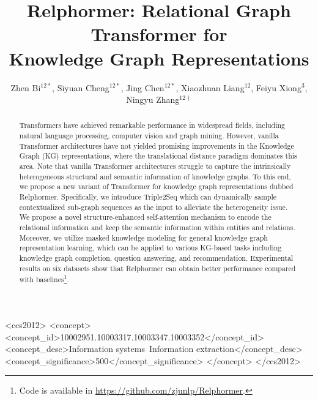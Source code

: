 \documentclass[sigconf]{acmart}
\begin{document}
\acmBooktitle{}


\title{Relphormer: Relational Graph Transformer for\\ Knowledge Graph Representations}

\author{
Zhen Bi$^{12*}$, 
Siyuan Cheng$^{12*}$, 
Jing Chen$^{12*}$, 
Xiaozhuan Liang$^{12}$, 
Feiyu Xiong$^{3}$, 
Ningyu Zhang$^{12\dagger}$
}





\begin{abstract}
Transformers have achieved remarkable performance in widespread fields, including natural language processing, computer vision and graph mining. However, vanilla Transformer architectures have not yielded promising improvements in the Knowledge Graph (KG) representations, where the translational distance paradigm dominates this area. Note that vanilla Transformer architectures struggle to capture the intrinsically heterogeneous structural and semantic information of knowledge graphs. To this end, we propose a new variant of Transformer for knowledge graph representations dubbed Relphormer. Specifically, we introduce Triple2Seq which can dynamically sample contextualized sub-graph sequences as the input to alleviate the heterogeneity issue. We propose a novel structure-enhanced self-attention mechanism to encode the relational information and keep the semantic information within entities and relations. Moreover, we utilize masked knowledge modeling for general knowledge graph representation learning, which can be applied to various KG-based tasks including knowledge graph completion, question answering, and recommendation. Experimental results on six datasets show that Relphormer can obtain better performance compared with baselines\footnote{Code is available in \url{https://github.com/zjunlp/Relphormer}.}.


\end{abstract}

\begin{CCSXML}
<ccs2012>
<concept>
<concept_id>10002951.10003317.10003347.10003352</concept_id>
<concept_desc>Information systems~Information extraction</concept_desc>
<concept_significance>500</concept_significance>
</concept>
</ccs2012>
\end{CCSXML}
\end{document}
